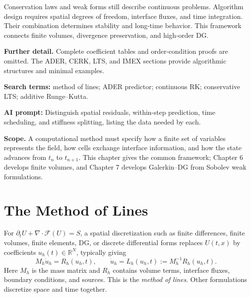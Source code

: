 \documentclass[11pt,openany]{book}
\numberwithin{equation}{chapter}
\theoremstyle{definition}
\theoremstyle{remark}
\newcommand{\RR}{\mathbb R}
\newcommand{\studyroute}[3]{%
  \par\smallskip\noindent\textbf{Further detail.} #1\par
  \begingroup\raggedright\noindent\textbf{Search terms:} #2.\par\endgroup
  \noindent\textbf{AI prompt:} #3\par
}
\begin{document}
\begin{chaptersummary}
Conservation laws and weak forms still describe continuous problems. Algorithm design requires spatial degrees of freedom, interface fluxes, and time integration. Their combination determines stability and long-time behavior. This framework connects finite volumes, divergence preservation, and high-order DG.
\end{chaptersummary}
\studyroute{Complete coefficient tables and order-condition proofs are omitted. The ADER, CERK, LTS, and IMEX sections provide algorithmic structures and minimal examples.}{method of lines; ADER predictor; continuous RK; conservative LTS; additive Runge--Kutta}{Distinguish spatial residuals, within-step prediction, time scheduling, and stiffness splitting, listing the data needed by each.}

\noindent\textbf{Scope.}
A computational method must specify how a finite set of variables represents the field, how cells exchange interface information, and how the state advances from $t_n$ to $t_{n+1}$. This chapter gives the common framework; Chapter 6 develops finite volumes, and Chapter 7 develops Galerkin--DG from Sobolev weak formulations.

\section{The Method of Lines}
For $\partial_t U+\nabla\cdot\mathcal F(U)=S$, a spatial discretization such as finite differences, finite volumes, finite elements, DG, or discrete differential forms replaces $U(t,x)$ by coefficients $u_h(t)\in\RR^N$, typically giving
\begin{equation}\label{eq:mol}
M_h\dot u_h=R_h(u_h,t),\qquad
\dot u_h=L_h(u_h,t):=M_h^{-1}R_h(u_h,t).
\end{equation}
Here $M_h$ is the mass matrix and $R_h$ contains volume terms, interface fluxes, boundary conditions, and sources. This is the \emph{method of lines}. Other formulations discretize space and time together.

\begin{center}
\end{center}
\end{document}
